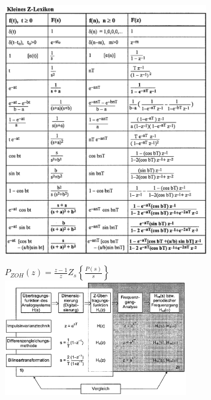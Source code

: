 \begin{minipage}{11cm}
	\includegraphics[height=11cm]{bilder/Z-Lexikon.png}
\end{minipage}
\begin{minipage}{8cm}
	$P_{ZOH}(z)=\frac{z-1}{z} Z_s \left\lbrace  \frac{P(s)}{s} \right\rbrace $\\
	\includegraphics[width=8cm]{bilder/IIR-ArbeitsschritteundVarianten.png}
\end{minipage}
